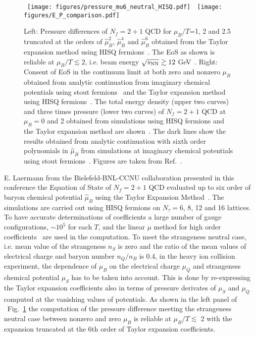 \documentclass{PoS}
\newcommand{\hmu}{\hat{\mu}}
\begin{document}
\begin{figure}
\begin{center}
~\texttt{[image: figures/pressure\_mu6\_neutral\_HISQ.pdf]}~~\texttt{[image: figures/E\_P\_comparison.pdf]}
\end{center}
\caption{Left: Pressure differences of $N_f=2+1$ QCD for $\mu_B/T$=1, 2 and 2.5 truncated at the orders of $\hmu_B^2$, $\hmu_B^4$ and $\hmu_B^6$ obtained from the Taylor expansion method using HISQ fermions~\cite{Bazavov:2017dus}.  The EoS as shown is reliable at $\mu_B/T\lesssim 2$, i.e. beam energy $\sqrt{s_{\rm NN}}\gtrsim 12$ GeV~\cite{Bazavov:2017dus}.
Right: Consent of EoS in the continuum limit at both zero and nonzero $\mu_B$ obtained from analytic continuation from imaginary chemical potentials using stout fermions~\cite{Gunther:2016vcp} and the Taylor expansion method using HISQ fermions~\cite{Bazavov:2017dus}. The total energy density (upper two curves) and three times pressure (lower two curves) of $N_f=2+1$ QCD at $\mu_B=0$ and 2 obtained from simulations using HISQ fermions and the Taylor expansion method are shown~\cite{Bazavov:2017dus}. The dark lines show the results obtained from analytic continuation with sixth order polynomials in $\hat{\mu}_B$ from simulations at imaginary chemical potentials using stout fermions~\cite{Gunther:2016vcp}. Figures are taken from Ref.~\cite{Bazavov:2017dus}.}
\label{fig:EoSMu}
\end{figure}


E. Laermann from the Bielefeld-BNL-CCNU collaboration presented in this conference the Equation of State of $N_f=2+1$ QCD evaluated
up to six order of baryon chemical potential $\hat{\mu}_B$ using the Taylor Expansion Method~\cite{Bazavov:2017dus}. The simulations are carried out using HISQ fermions on $N_\tau=$6, 8, 12 and 16 lattices. To have accurate determinations of coefficients
a large number of gauge configurations, $\sim10^5$ for each $T$, and the linear $\mu$ method for high order coefficients~\cite{Gavai:2011uk,Gavai:2014lia} are used in the computation.
To meet the strangeness neutral case, i.e. mean value of the strangeness $n_S$ is zero and the ratio of the mean values of electrical charge and baryon number $n_Q/n_B$ is 0.4, in the heavy ion collision experiment,
the dependence of $\mu_B$ on the electrical charge $\mu_Q$ and strangeness chemical potential $\mu_S$  has to be taken into account. This is done by re-expressing the Taylor expansion coefficients also in terms of pressure derivates of $\mu_S$ and $\mu_Q$ computed at the vanishing values of potentials. As shown in the left panel of ~Fig.~\ref{fig:EoSMu} the computation of the pressure difference meeting the strangeness neutral case between nonzero and zero $\mu_B$ is reliable at $\mu_B/T\lesssim$ 2 with the expansion truncated at the 6th order of Taylor expansion coefficients.
\end{document}
